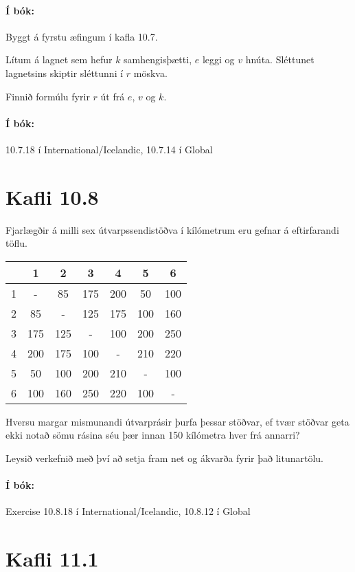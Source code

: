 \documentclass{article}
\begin{document}
\paragraph{Í bók:} Byggt á fyrstu æfingum í kafla 10.7.

\question

Lítum á lagnet sem hefur $k$ samhengisþætti, $e$ leggi og $v$ hnúta. Sléttunet lagnetsins skiptir sléttunni í $r$ möskva.

Finnið formúlu fyrir $r$ út frá $e$, $v$ og $k$.

\paragraph{Í bók:} 10.7.18 í International/Icelandic, 10.7.14 í Global

\section{Kafli 10.8}

\question Fjarlægðir á milli sex útvarpssendistöðva í kílómetrum eru gefnar á eftirfarandi töflu.

\begin{center}

\begin{tabular}{ccccccc}
\toprule
&1&2&3&4&5&6\\
\midrule
1&-&85&175&200&50&100\\
2&85&-&125&175&100&160\\
3&175&125&-&100&200&250\\
4&200&175&100&-&210&220\\
5&50&100&200&210&-&100\\
6&100&160&250&220&100&-\\
\bottomrule
\end{tabular}

\end{center}
Hversu margar mismunandi útvarprásir þurfa þessar stöðvar, ef tvær stöðvar geta ekki notað sömu rásina séu þær innan 150 kílómetra hver frá annarri?

Leysið verkefnið með því að setja fram net og ákvarða fyrir það litunartölu.

\paragraph{Í bók:} Exercise 10.8.18 í International/Icelandic, 10.8.12 í Global

\section{Kafli 11.1}
\end{document}
